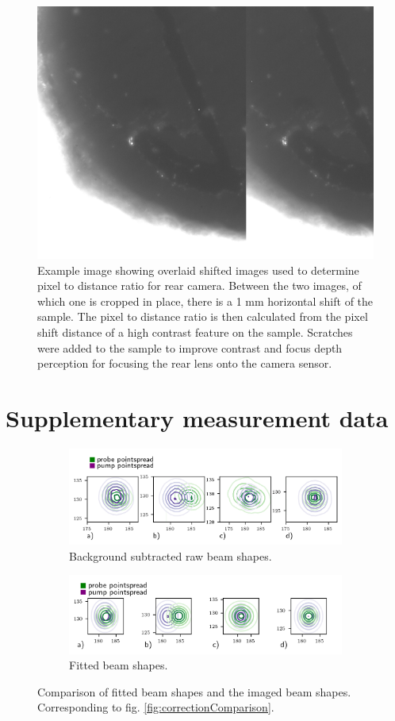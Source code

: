 \documentclass[twoside,openright,listof=numbered]{scrreprt}
\begin{document}
\begin{figure}[hbtp]
\centering
\includegraphics[width=0.5\linewidth]{images/TAM/BackFocus9.85mm-1mmHorizontalDiscplacement.png}
\caption[Example image showing overlaid shifted images used to determine pixel to distance ratio for rear camera.]{Example image showing overlaid shifted images used to determine pixel to distance ratio for rear camera. Between the two images, of which one is cropped in place, there is a 1 mm horizontal shift of the sample. The pixel to distance ratio is then calculated from the pixel shift distance of a high contrast feature on the sample. Scratches were added to the sample to improve contrast and focus depth perception for focusing the rear lens onto the camera sensor.\label{fig:micrometerToPxExample}}
\end{figure}

\section*{Supplementary measurement data}

\begin{figure}[hbp]
\centering
\begin{subfigure}[t]{\linewidth}
\centering
\includegraphics[scale=1]{images/CompensationTestRaw.png}
\caption{Background subtracted raw beam shapes.}
\end{subfigure}
\begin{subfigure}[t]{\linewidth}
\centering
\includegraphics[scale=1]{images/CompensationTestFitted.png}
\caption{Fitted beam shapes.}
\end{subfigure}
\caption[Comparison of fitted beam shapes and the imaged beam shapes.]{Comparison of fitted beam shapes and the imaged beam shapes. Corresponding to fig. \ref{fig:correctionComparison}. \label{fig:rawVsFittedBeam}}
\end{figure}
\end{document}
